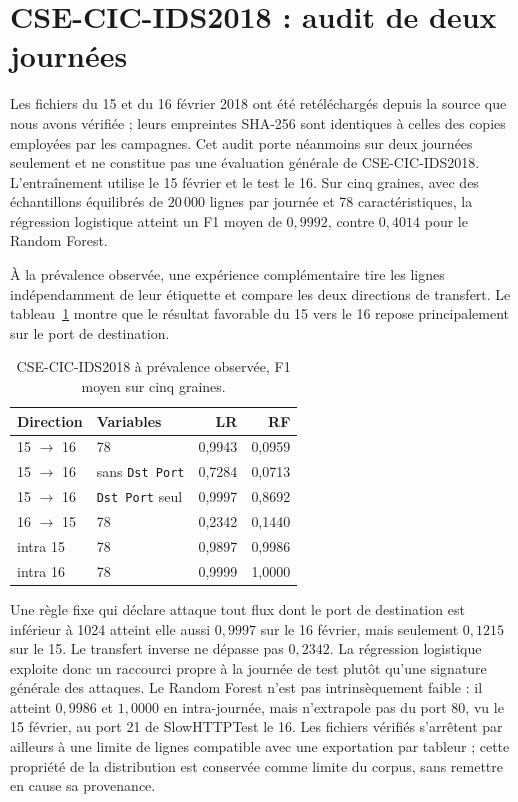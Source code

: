 \section{CSE-CIC-IDS2018 : audit de deux journées}
\label{sec:csecic-resultats}

Les fichiers du 15 et du 16 février 2018 ont été retéléchargés depuis la source que nous avons vérifiée ; leurs empreintes SHA-256 sont identiques à celles des copies employées par les campagnes. Cet audit porte néanmoins sur deux journées seulement et ne constitue pas une évaluation générale de CSE-CIC-IDS2018. L'entraînement utilise le 15 février et le test le 16. Sur cinq graines, avec des échantillons équilibrés de $20\,000$ lignes par journée et 78 caractéristiques, la régression logistique atteint un F1 moyen de $0{,}9992$, contre $0{,}4014$ pour le Random Forest.

À la prévalence observée, une expérience complémentaire tire les lignes indépendamment de leur étiquette et compare les deux directions de transfert. Le tableau~\ref{tab:csecic-prevalence} montre que le résultat favorable du 15 vers le 16 repose principalement sur le port de destination.

\begin{table}[H]
\centering
\caption{CSE-CIC-IDS2018 à prévalence observée, F1 moyen sur cinq graines.}
\label{tab:csecic-prevalence}
\small
\begin{tabular}{llrr}
\toprule
\textbf{Direction} & \textbf{Variables} & \textbf{LR} & \textbf{RF} \\
\midrule
15 $\rightarrow$ 16 & 78 & 0,9943 & 0,0959 \\
15 $\rightarrow$ 16 & sans \texttt{Dst Port} & 0,7284 & 0,0713 \\
15 $\rightarrow$ 16 & \texttt{Dst Port} seul & 0,9997 & 0,8692 \\
16 $\rightarrow$ 15 & 78 & 0,2342 & 0,1440 \\
intra 15 & 78 & 0,9897 & 0,9986 \\
intra 16 & 78 & 0,9999 & 1,0000 \\
\bottomrule
\end{tabular}
\end{table}

Une règle fixe qui déclare attaque tout flux dont le port de destination est inférieur à 1024 atteint elle aussi $0{,}9997$ sur le 16 février, mais seulement $0{,}1215$ sur le 15. Le transfert inverse ne dépasse pas $0{,}2342$. La régression logistique exploite donc un raccourci propre à la journée de test plutôt qu'une signature générale des attaques. Le Random Forest n'est pas intrinsèquement faible : il atteint $0{,}9986$ et $1{,}0000$ en intra-journée, mais n'extrapole pas du port 80, vu le 15 février, au port 21 de SlowHTTPTest le 16. Les fichiers vérifiés s'arrêtent par ailleurs à une limite de lignes compatible avec une exportation par tableur ; cette propriété de la distribution est conservée comme limite du corpus, sans remettre en cause sa provenance.

